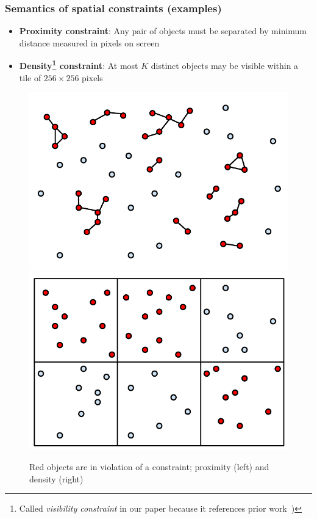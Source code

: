 \documentclass{beamer}
\begin{document}
\frame
{
  \frametitle{Semantics of spatial constraints (examples)}
  \begin{itemize}
  \item \textbf{Proximity constraint}: Any pair of objects must be separated by minimum distance measured in pixels on screen
  \item \textbf{Density\footnote{Called \emph{visibility constraint} in our paper because it references prior work~\cite{fusiontables})} constraint}: At most $K$ distinct objects may be visible within a tile of $256 \times 256$ pixels
  \end{itemize}
  \begin{center}
  \begin{figure}
  \label{fig:contraints}
  \includegraphics[scale=0.4]{figs/cvl-proximity.pdf} \includegraphics[scale=0.4]{figs/cvl-visibility.pdf}
  \caption{Red objects are in violation of a constraint; proximity (left) and density (right)}
  \end{figure}
  \end{center}
}
\end{document}
